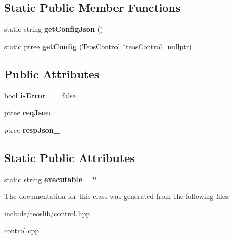 \subsection*{Static Public Member Functions}
\begin{DoxyCompactItemize}
\item 
\mbox{\label{classteos_1_1_teos_control_a471b1a6439c02698604ae4e04d84ad71}} 
static string {\bfseries get\+Config\+Json} ()
\item 
\mbox{\label{classteos_1_1_teos_control_af722aad463e41fb96d4049372148d41c}} 
static ptree {\bfseries get\+Config} (\mbox{\hyperlink{classteos_1_1_teos_control}{Teos\+Control}} $\ast$teos\+Control=nullptr)
\end{DoxyCompactItemize}
\subsection*{Public Attributes}
\begin{DoxyCompactItemize}
\item 
\mbox{\label{classteos_1_1_teos_control_ac8e6788b523dcd724c7a424818da7849}} 
bool {\bfseries is\+Error\+\_\+} = false
\item 
\mbox{\label{classteos_1_1_teos_control_a6122f1a2263a80dacd315739861feac7}} 
ptree {\bfseries req\+Json\+\_\+}
\item 
\mbox{\label{classteos_1_1_teos_control_a1f5268be242e9f6182a083a4d4ec393e}} 
ptree {\bfseries resp\+Json\+\_\+}
\end{DoxyCompactItemize}
\subsection*{Static Public Attributes}
\begin{DoxyCompactItemize}
\item 
\mbox{\label{classteos_1_1_teos_control_a6c5d2f3f5abcfaf31728ae410a28b50b}} 
static string {\bfseries executable} = \char`\"{}\char`\"{}
\end{DoxyCompactItemize}


The documentation for this class was generated from the following files\+:\begin{DoxyCompactItemize}
\item 
include/teoslib/control.\+hpp\item 
control.\+cpp\end{DoxyCompactItemize}
